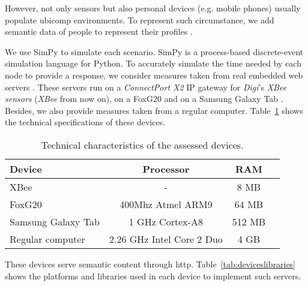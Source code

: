 However, not only sensors but also personal devices (e.g. mobile phones) usually populate \ac{ubicomp} environments.
To represent such circumstance, we add semantic data of people to represent their profiles .

We use SimPy  to simulate each scenario.
SimPy is a process-based discrete-event simulation language for Python.
To accurately simulate the time needed by each node to provide a response, we consider measures taken from real embedded web servers \citep{gomez-goiri_restful_2012}.
These servers run on a \textit{ConnectPort X2} IP gateway  for \textit{Digi}'s \textit{XBee sensors}  (\textit{XBee} from now on),
on a FoxG20  and on a Samsung Galaxy Tab .
Besides, we also provide measures taken from a regular computer.
Table~\ref{tab:technicalDetails} shows the technical specifications of these devices.


\begin{table}
  \caption{Technical characteristics of the assessed devices.}
  \small
  \begin{center}
    \begin{tabular}{lccc}
      \hline
      Device & Processor & RAM \\
      \hline
      XBee &  - & 8 MB  \\
      FoxG20 & 400Mhz Atmel ARM9 &  64 MB \\
      Samsung Galaxy Tab & 1 GHz Cortex-A8  &  512 MB \\
      Regular computer & 2.26 GHz Intel Core 2 Duo  &  4 GB \\
      \hline
    \end{tabular}
  \end{center}
  \label{tab:technicalDetails}
\end{table}

These devices serve semantic content through \acs{http}.
Table~\ref{tab:deviceslibraries} shows the platforms and libraries used in each device to implement such servers.

